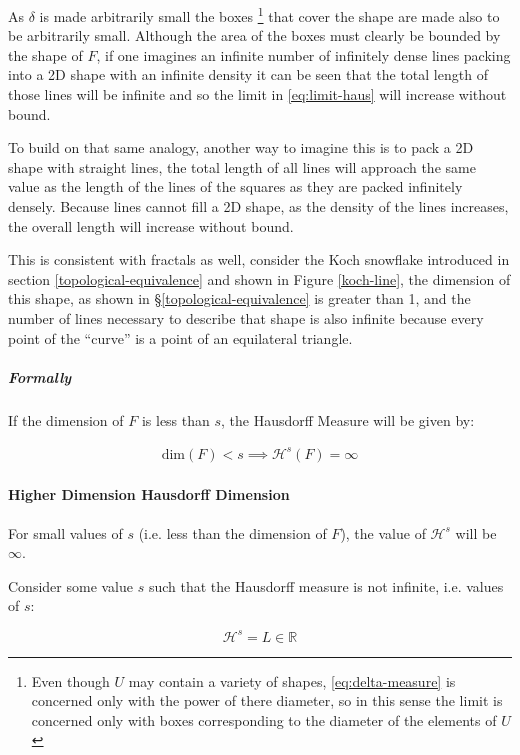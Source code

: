 \documentclass[a4paper,11pt,twoside]{article}
\begin{document}
As \(\delta\) is made arbitrarily small the boxes \footnote{Even though \(U\) may contain a variety of shapes, \eqref{eq:delta-measure} is concerned only with the power of there diameter, so in this sense the limit is concerned only with boxes corresponding to the diameter of the elements of \(U\)} that cover the shape are made also to be arbitrarily small. Although the area of the boxes must clearly be bounded by the shape of \(F\), if one imagines an infinite number of infinitely dense lines packing into a 2D shape with an infinite density it can be seen that the total length of those lines will be infinite and so the limit in \eqref{eq:limit-haus} will increase without bound.

To build on that same analogy, another way to imagine this is to pack a 2D shape with straight lines, the total length of all lines will approach the same value as the length of the lines of the squares as they are packed infinitely densely. Because lines cannot fill a 2D shape, as the density of the lines increases, the overall length will increase without bound.

This is consistent with fractals as well, consider the Koch snowflake introduced in section \ref{topological-equivalence} and shown in Figure \ref{koch-line}, the dimension of this shape, as shown in \S \ref{topological-equivalence} is greater than 1, and the number of lines necessary to describe that shape is also infinite because every point of the ``curve'' is a point of an equilateral triangle.

\subparagraph{Formally}
\label{sec:orgf7e8773}
If the dimension of \(F\) is less than \(s\), the Hausdorff Measure will be given by:

\begin{align}
\mathrm{dim}\left(  F \right ) < s \implies \mathcal{H}^{s} \left( F \right)  = \infty
\end{align}

\paragraph{Higher Dimension Hausdorff Dimension}
\label{sec:orgafbb894}


For small values of \(s\) (i.e. less than the dimension of  \(F\)), the value of \(\mathcal{H}^s\)  will be \(\infty\).

Consider some value \(s\) such that the Hausdorff measure is not infinite, i.e. values of \(s\):

\[
\mathcal{H}^s = L \in \mathbb{R}
\]
\end{document}

